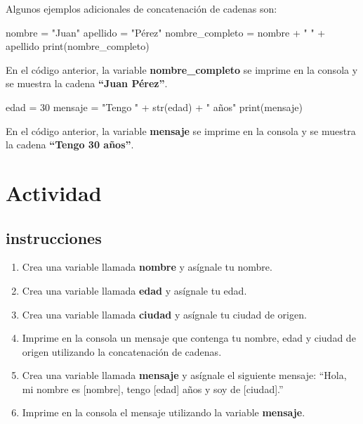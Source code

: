 \documentclass[
  a4paper,
  DIV=11,
  numbers=noendperiod,
  onepage,
  openany]{scrreprt}
\newenvironment{Shaded}{\begin{snugshade}}{\end{snugshade}}
\newcommand{\BuiltInTok}[1]{\textcolor[rgb]{0.00,0.23,0.31}{#1}}
\newcommand{\DecValTok}[1]{\textcolor[rgb]{0.68,0.00,0.00}{#1}}
\newcommand{\NormalTok}[1]{\textcolor[rgb]{0.00,0.23,0.31}{#1}}
\newcommand{\OperatorTok}[1]{\textcolor[rgb]{0.37,0.37,0.37}{#1}}
\newcommand{\StringTok}[1]{\textcolor[rgb]{0.13,0.47,0.30}{#1}}
\begin{document}
Algunos ejemplos adicionales de concatenación de cadenas son:

\begin{Shaded}
\begin{Highlighting}[]
\NormalTok{nombre }\OperatorTok{=} \StringTok{"Juan"}
\NormalTok{apellido }\OperatorTok{=} \StringTok{"Pérez"}
\NormalTok{nombre\_completo }\OperatorTok{=}\NormalTok{ nombre }\OperatorTok{+} \StringTok{" "} \OperatorTok{+}\NormalTok{ apellido}
\BuiltInTok{print}\NormalTok{(nombre\_completo)}
\end{Highlighting}
\end{Shaded}

En el código anterior, la variable \textbf{nombre\_completo} se imprime
en la consola y se muestra la cadena \textbf{``Juan Pérez''}.

\begin{Shaded}
\begin{Highlighting}[]
\NormalTok{edad }\OperatorTok{=} \DecValTok{30}
\NormalTok{mensaje }\OperatorTok{=} \StringTok{"Tengo "} \OperatorTok{+} \BuiltInTok{str}\NormalTok{(edad) }\OperatorTok{+} \StringTok{" años"}
\BuiltInTok{print}\NormalTok{(mensaje)}
\end{Highlighting}
\end{Shaded}

En el código anterior, la variable \textbf{mensaje} se imprime en la
consola y se muestra la cadena \textbf{``Tengo 30 años''}.

\chapter{Actividad}\label{actividad}

\section{instrucciones}\label{instrucciones}

\begin{enumerate}
\def\labelenumi{\arabic{enumi}.}
\item
  Crea una variable llamada \textbf{nombre} y asígnale tu nombre.
\item
  Crea una variable llamada \textbf{edad} y asígnale tu edad.
\item
  Crea una variable llamada \textbf{ciudad} y asígnale tu ciudad de
  origen.
\item
  Imprime en la consola un mensaje que contenga tu nombre, edad y ciudad
  de origen utilizando la concatenación de cadenas.
\item
  Crea una variable llamada \textbf{mensaje} y asígnale el siguiente
  mensaje: ``Hola, mi nombre es {[}nombre{]}, tengo {[}edad{]} años y
  soy de {[}ciudad{]}.''
\item
  Imprime en la consola el mensaje utilizando la variable
  \textbf{mensaje}.
\end{enumerate}
\end{document}
